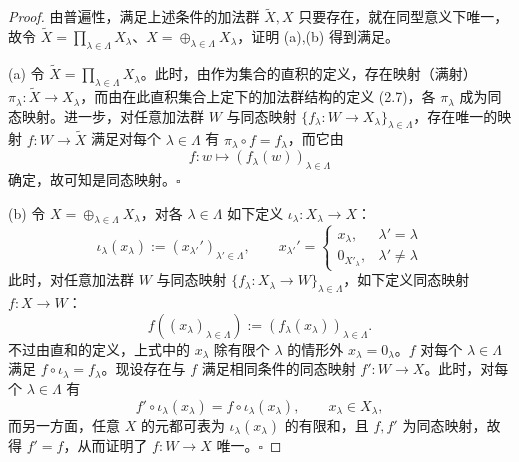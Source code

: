 \begin{proof}
由普遍性，满足上述条件的加法群 $\tilde{X},X$ 只要存在，就在同型意义下唯一，故令 $\tilde{X}=\prod_{\lambda\in\Lambda}X_\lambda$、$X=\oplus_{\lambda\in\Lambda}X_\lambda$，证明 (a),(b) 得到满足。

(a) 令 $\tilde{X}=\prod_{\lambda\in\Lambda}X_\lambda$。此时，由作为集合的直积的定义，存在映射（满射）$\pi_\lambda\colon \tilde{X}\to X_\lambda$，而由在此直积集合上定下的加法群结构的定义 (2.7)，各 $\pi_\lambda$ 成为同态映射。进一步，对任意加法群 $W$ 与同态映射 $\{f_\lambda\colon W\to X_\lambda\}_{\lambda\in\Lambda}$，存在唯一的映射 $f\colon W\to\tilde{X}$ 满足对每个 $\lambda\in\Lambda$ 有 $\pi_\lambda\circ f=f_\lambda$，而它由
\[
  f\colon w\mapsto (f_\lambda(w))_{\lambda\in\Lambda}
\]
确定，故可知是同态映射。\hfill$\square$

(b) 令 $X=\oplus_{\lambda\in\Lambda}X_\lambda$，对各 $\lambda\in\Lambda$ 如下定义 $\iota_\lambda\colon X_\lambda\to X$：
\begin{equation}
  \iota_\lambda(x_\lambda):=(x_{\lambda'}')_{\lambda'\in\Lambda},\qquad
  x_{\lambda'}'=\begin{cases}
    x_\lambda, & \lambda'=\lambda\\
    0_{X'_\lambda}, & \lambda'\neq\lambda
  \end{cases} \tag{2.8}
\end{equation}
此时，对任意加法群 $W$ 与同态映射 $\{f_\lambda\colon X_\lambda\to W\}_{\lambda\in\Lambda}$，如下定义同态映射 $f\colon X\to W$：
\[
  f((x_\lambda)_{\lambda\in\Lambda}):=(f_\lambda(x_\lambda))_{\lambda\in\Lambda}.
\]
不过由直和的定义，上式中的 $x_\lambda$ 除有限个 $\lambda$ 的情形外 $x_\lambda=0_\lambda$。$f$ 对每个 $\lambda\in\Lambda$ 满足 $f\circ\iota_\lambda=f_\lambda$。现设存在与 $f$ 满足相同条件的同态映射 $f'\colon W\to X$。此时，对每个 $\lambda\in\Lambda$ 有
\[
  f'\circ\iota_\lambda(x_\lambda)=f\circ\iota_\lambda(x_\lambda),\qquad x_\lambda\in X_\lambda,
\]
而另一方面，任意 $X$ 的元都可表为 $\iota_\lambda(x_\lambda)$ 的有限和，且 $f,f'$ 为同态映射，故得 $f'=f$，从而证明了 $f\colon W\to X$ 唯一。\hfill$\square$
\end{proof}



